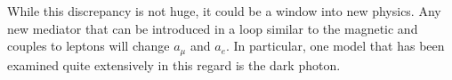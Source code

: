 While this discrepancy is not huge, it could be a window into new physics.
Any new mediator that can be introduced in a loop similar to the magnetic and couples to leptons will change $a_\mu$ and $a_e$.
In particular, one model that has been examined quite extensively in this regard is the dark photon.
